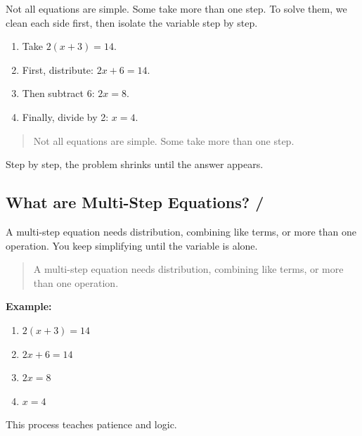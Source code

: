 Not all equations are simple. Some take more than one step. To solve them, we clean each side first, then isolate the variable step by step.  

\begin{enumerate}
    \item Take \(2(x + 3) = 14\).
    \item First, distribute: \(2x + 6 = 14\).  
    \item Then subtract 6: \(2x = 8\).  
    \item Finally, divide by 2: \(x = 4\).
\end{enumerate}


\blockquote{Not all equations are simple. Some take more than one step.}


Step by step, the problem shrinks until the answer appears.  

\subsection{What are Multi-Step Equations? / }

A multi-step equation needs distribution, combining like terms, or more than one operation. You keep simplifying until the variable is alone.  

\blockquote{A multi-step equation needs distribution, combining like terms, or more than one operation.}



\textbf{Example:}
\begin{enumerate}
    \item \(2(x + 3) = 14\)
    \item \(2x + 6 = 14\) 
    \item \(2x = 8\) 
    \item \(x = 4\)
\end{enumerate}

This process teaches patience and logic.  






















